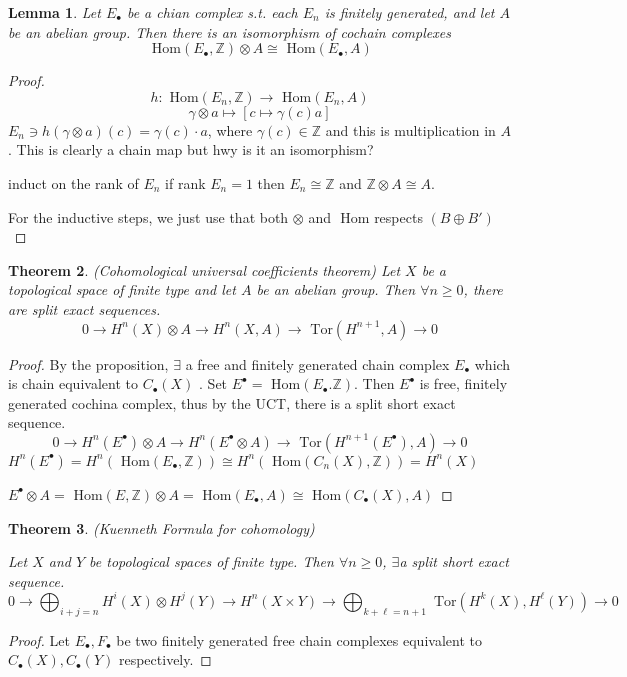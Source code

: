 \documentclass[11pt]{article}
\newtheorem{thm}{Theorem}[section]
\newtheorem{lemma}[thm]{Lemma}
\renewcommand{\hom}{\text{ Hom}}
\newcommand{\tor}{\text{ Tor}}
\newcommand{\intg}{\mathbb Z}
\newcommand{\lrta}{\longrightarrow}
\begin{document}
\begin{lemma}
Let $E_\bullet$ be a chian complex s.t. each $E_n$ is finitely generated, and let $A$ be an abelian group. Then there is an isomorphism of cochain complexes
$$
\hom(E_\bullet, \intg)\otimes A\cong \hom(E_\bullet, A)
$$
\end{lemma}
\begin{proof}
$$
h: \hom(E_n,\intg)\lrta \hom(E_n,A)
$$
$$
\gamma\otimes a\longmapsto [c\mapsto \gamma(c)a]
$$
$E_n\ni h(\gamma\otimes a)(c)=\gamma(c)\cdot a$, where $\gamma(c)\in \intg$ and this is multiplication in $A$. This is clearly a chain map  but hwy is it an isomorphism?

induct on the rank of $E_n$ if rank $E_n=1$ then $E_n\cong \intg$ and $\intg\otimes A\cong A$. 

For the inductive steps, we just use that both $\otimes $ and $\hom$ respects $(B\oplus B')$
\end{proof}


\begin{thm}
(Cohomological universal coefficients theorem) Let $X $ be a topological space of finite type and let $A$ be an abelian group. Then $\forall n\geq 0$, there are split exact sequences.
$$
0\lrta H^n(X)\otimes A\lrta H^n(X,A)\lrta \tor(H^{n+1},A)\lrta 0
$$
\end{thm}
\begin{proof}
By the proposition, $\exists $ a free and finitely generated chain complex $E_\bullet$ which is chain equivalent to $C_\bullet (X)$ . Set $E^\bullet=\hom(E_\bullet.\intg)$. Then $E^\bullet$ is free, finitely generated cochina complex, thus by the UCT, there is a split short exact sequence.
$$
0\lrta H^n(E^\bullet)\otimes A\lrta H^n(E^\bullet\otimes A)\lrta \tor(H^{n+1}(E^\bullet), A)\lrta 0
$$
$H^n(E^\bullet)=H^n(\hom(
E_\bullet ,\intg))\cong H^n(\hom(C_n(X),\intg))=H^n(X)$ 

$E^\bullet\otimes A=\hom(E,\intg)\otimes A=\hom(E_\bullet,A)\cong \hom(C_\bullet(X),A)$
\end{proof}

\begin{thm}
(Kuenneth Formula for cohomology)

Let $X$ and $Y$ be topological spaces of finite type. Then $\forall n\geq 0$, $\exists $a split short exact sequence.
$$
0\lrta \bigoplus_{i+j=n}H^i(X)\otimes H^j(Y)\lrta H^n(X\times Y)\lrta \bigoplus_{k+\ell=n+1}\tor(H^k(X),H^\ell(Y))\lrta 0
$$
\end{thm}
\begin{proof}
Let $E_\bullet, F_\bullet$ be two finitely generated free chain complexes equivalent to $C_\bullet(X), C_\bullet(Y)$ respectively.
\end{proof}
\end{document}
